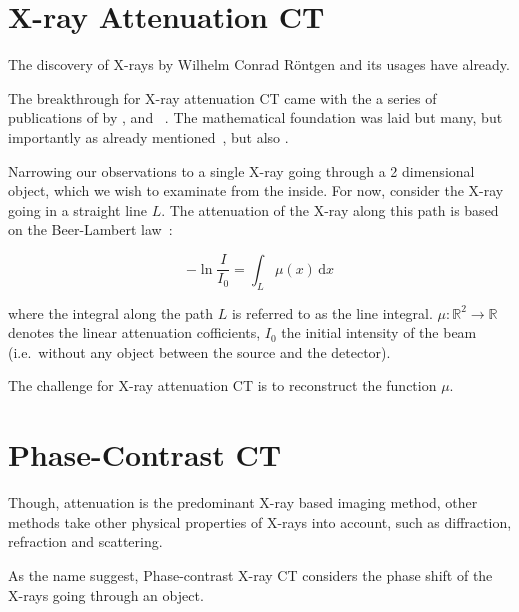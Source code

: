\section{X-ray Attenuation CT}\label{sec:xray_attenuation_ct}

The discovery of X-rays by Wilhelm Conrad Röntgen  and its
usages have already.

The breakthrough for X-ray attenuation CT came with the a series of publications of by
\citeauthor{hounsfield_computerized_1973}\cite{hounsfield_computerized_1973},
\citeauthor{ambrose_computerized_1973}\cite{ambrose_computerized_1973} and
~\citeauthor{perry_computerized_1973}\cite{perry_computerized_1973}. The mathematical foundation was
laid but many, but importantly as already mentioned~\citeauthor{radon_uber_1917}, but also
\citeauthor{cormack_representation_1963}\cite{cormack_representation_1963}.

Narrowing our observations to a single X-ray going through a 2 dimensional object, which we wish to
examinate from the inside. For now, consider the X-ray going in a straight line \(L\). The
attenuation of the X-ray along this path is based on the Beer-Lambert law~\cite{buzug_computed_2008}:

\begin{equation}
	\label{eq:beer-Lambert-law}
	- \ln \frac{I}{I_0} = \int_L \mu (x) \, \mathrm{d}x
\end{equation}

where the integral along the path \(L\) is referred to as the line integral.
\(\mu \colon \mathbb{R}^2 \to \mathbb{R}\) denotes the linear attenuation cofficients, \(I_0\)
the initial intensity of the beam (i.e.\ without any object between the source and the detector).

The challenge for X-ray attenuation CT is to reconstruct the function \(\mu\).

\section{Phase-Contrast CT}\label{sec:phasecontrast_ct}

Though, attenuation is the predominant X-ray based imaging method, other methods take other physical
properties of X-rays into account, such as diffraction, refraction and scattering.

As the name suggest, Phase-contrast X-ray CT considers the phase shift of the X-rays going through
an object.

